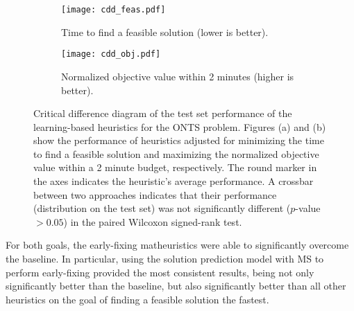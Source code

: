 \begin{figure}[h]
    \centering
    \begin{subfigure}{0.99\textwidth}
        \centering
        \texttt{[image: cdd\_feas.pdf]}
        \caption{Time to find a feasible solution (lower is better).}
        \label{fig:cdd-feas}
    \end{subfigure}
    \begin{subfigure}{0.99\textwidth}
        \centering
        \texttt{[image: cdd\_obj.pdf]}
        \caption{Normalized objective value within 2 minutes (higher is better).}
        \label{fig:cdd-obj}
    \end{subfigure}
    \caption{%
    Critical difference diagram of the test set performance of the learning-based heuristics for the ONTS problem.
    Figures (a) and (b) show the performance of heuristics adjusted for minimizing the time to find a feasible solution and maximizing the normalized objective value within a 2 minute budget, respectively.
    The round marker in the axes indicates the heuristic's average performance.
    A crossbar between two approaches indicates that their performance (distribution on the test set) was not significantly different ($p$-value $>0.05$) in the paired Wilcoxon signed-rank test.
    }
    \label{fig:cdds}
\end{figure}

For both goals, the early-fixing matheuristics were able to significantly overcome the baseline.
In particular, using the solution prediction model with MS to perform early-fixing provided the most consistent results, being not only significantly better than the baseline, but also significantly better than all other heuristics on the goal of finding a feasible solution the fastest.

